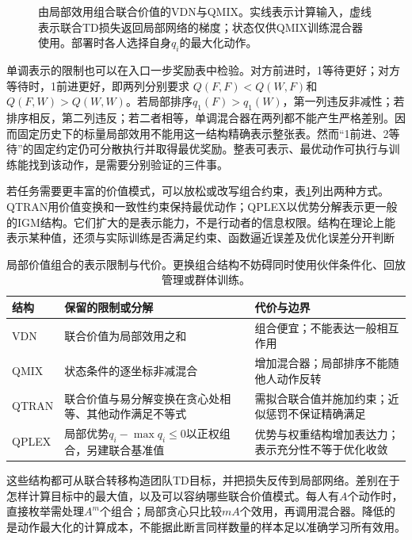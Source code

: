 \begin{figure}[htbp]
 \centering
 
 \caption{由局部效用组合联合价值的VDN与QMIX。实线表示计算输入，虚线表示联合TD损失返回局部网络的梯度；状态仅供QMIX训练混合器使用。部署时各人选择自身$q_i$的最大化动作。}
 \label{fig:rl-multi-agent-mixers}
\end{figure}

单调表示的限制也可以在入口一步奖励表中检验。对方前进时，1等待更好；对方等待时，1前进更好，即两列分别要求
$Q(F,F)<Q(W,F)$和$Q(F,W)>Q(W,W)$。若局部排序$q_1(F)>q_1(W)$，第一列违反非减性；若排序相反，第二列违反；若二者相等，单调混合器在两列都不能产生严格差别。因而固定历史下的标量局部效用不能用这一结构精确表示整张表。然而“1前进、2等待”的固定约定仍可分散执行并取得最优奖励。整表可表示、最优动作可执行与训练能找到该动作，是需要分别验证的三件事。

若任务需要更丰富的价值模式，可以放松或改写组合约束，表\ref{tab:rl-multi-agent-factorization}列出两种方式。QTRAN用价值变换和一致性约束保持最优动作；QPLEX以优势分解表示更一般的IGM结构。它们扩大的是表示能力，不是行动者的信息权限。结构在理论上能表示某种值，还须与实际训练是否满足约束、函数逼近误差及优化误差分开判断

\begin{table}[htbp]
 \centering
 \begin{tabularx}{\linewidth}{@{}l >{\raggedright\arraybackslash}X >{\raggedright\arraybackslash}X@{}}
 \toprule
 结构 & 保留的限制或分解 & 代价与边界\\
 \midrule
 VDN & 联合价值为局部效用之和 & 组合便宜；不能表达一般相互作用\\
 QMIX & 状态条件的逐坐标非减混合 & 增加混合器；局部排序不能随他人动作反转\\
 QTRAN & 联合价值与易分解变换在贪心处相等、其他动作满足不等式 & 需拟合联合值并施加约束；近似惩罚不保证精确满足\\
 QPLEX & 局部优势$q_i-\max q_i\leq0$以正权组合，另建联合基准值 & 优势与权重结构增加表达力；表示充分性不等于优化收敛\\
 \bottomrule
 \end{tabularx}
 \caption{局部价值组合的表示限制与代价。更换组合结构不妨碍同时使用伙伴条件化、回放管理或群体训练。}
 \label{tab:rl-multi-agent-factorization}
\end{table}

这些结构都可从联合转移构造团队TD目标，并把损失反传到局部网络。差别在于怎样计算目标中的最大值，以及可以容纳哪些联合价值模式。每人有$A$个动作时，直接枚举需处理$A^m$个组合；局部贪心只比较$mA$个效用，再调用混合器。降低的是动作最大化的计算成本，不能据此断言同样数量的样本足以准确学习所有效用。

